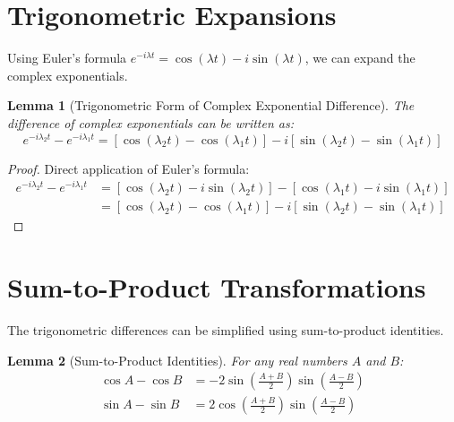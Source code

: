 \documentclass[12pt]{article}
\newtheorem{lemma}{Lemma}
\begin{document}
\section{Trigonometric Expansions}

Using Euler's formula $e^{-i\lambda t} = \cos(\lambda t) - i\sin(\lambda t)$, we can expand the complex exponentials.

\begin{lemma}[Trigonometric Form of Complex Exponential Difference]
The difference of complex exponentials can be written as:
\begin{equation}
e^{-i\lambda_2 t} - e^{-i\lambda_1 t} = [\cos(\lambda_2 t) - \cos(\lambda_1 t)] - i[\sin(\lambda_2 t) - \sin(\lambda_1 t)]
\end{equation}
\end{lemma}

\begin{proof}
Direct application of Euler's formula:
\begin{align}
e^{-i\lambda_2 t} - e^{-i\lambda_1 t} &= [\cos(\lambda_2 t) - i\sin(\lambda_2 t)] - [\cos(\lambda_1 t) - i\sin(\lambda_1 t)]\\
&= [\cos(\lambda_2 t) - \cos(\lambda_1 t)] - i[\sin(\lambda_2 t) - \sin(\lambda_1 t)]
\end{align}
\end{proof}

\section{Sum-to-Product Transformations}

The trigonometric differences can be simplified using sum-to-product identities.

\begin{lemma}[Sum-to-Product Identities]
For any real numbers $A$ and $B$:
\begin{align}
\cos A - \cos B &= -2\sin\left(\frac{A+B}{2}\right)\sin\left(\frac{A-B}{2}\right)\\
\sin A - \sin B &= 2\cos\left(\frac{A+B}{2}\right)\sin\left(\frac{A-B}{2}\right)
\end{align}
\end{lemma}
\end{document}
